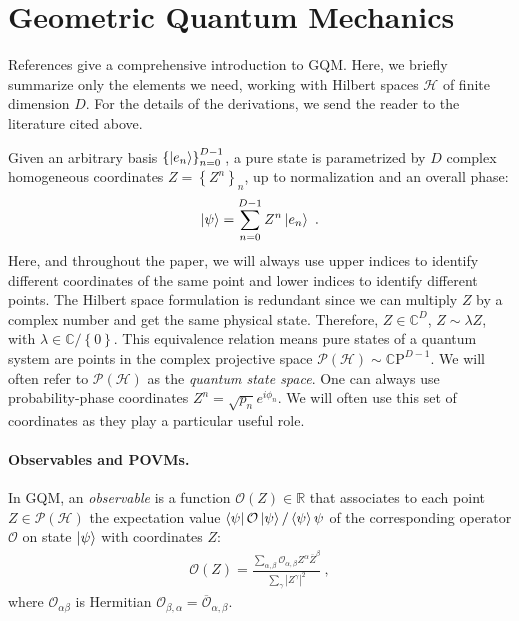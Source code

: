 \documentclass[draft,nofootinbib,pre,twocolumn,showpacs,showkeys,preprintnumbers,floatfix]{revtex4-1}
\newcommand{\1}{\mathbbm{1}}
\newcommand{\PH}{\mathcal{P}(\mathcal{H})}
\begin{document}
\section{Geometric Quantum Mechanics}
\label{sec:GQM}

References
\cite{STROCCHI1966,Miel68,Kibble1979,Heslot1985,Page87,And90,Gibbons1992,Ashtekar1995,Ashtekar1999,Brody2001,Bengtsson2017,Carinena2007,Chruscinski2006,Marmo2010,Avron2020,Pastorello2015,Pastorello2015a,Pastorello2016,Clemente-Gallardo2013}
give a comprehensive introduction to GQM. Here, we briefly summarize only the
elements we need, working with Hilbert spaces $\mathcal{H}$ of finite dimension $D$.
For the details of the derivations, we send the reader to the literature cited above.

Given an arbitrary basis $\left\{\ket{e_n} \right\}_{n=0}^{D-1}$, a pure state is
parametrized by $D$ complex homogeneous coordinates $Z = \left\{      Z^n\right\}_n$, up to
normalization and an overall phase:
\begin{align*}
\ket{\psi} = \sum_{n=0}^{D-1} Z^n \ket{e_n}~.
\end{align*}
Here, and throughout the paper, we will always use upper indices to identify different 
coordinates of the same point and lower indices to identify different points. The Hilbert space
formulation is redundant since we can multiply $Z$ by a complex number and get the same 
physical state. Therefore, $Z \in \mathbb{C}^{D}$, $Z \sim \lambda Z$, with $\lambda \in \mathbb{C}/\left\{ 0\right\}$. This equivalence 
relation means pure states of a quantum system are points in the complex projective space $\mathcal{P}\left(
\mathcal{H} \right) \sim \mathbb{C}\mathrm{P}^{D-1}$. We will often refer to $\PH$ as the \emph{quantum 
state space}. One can always use probability-phase coordinates $Z^n = \sqrt{p_n} e^{i\phi_n}$. We will often use 
this set of coordinates as they play a particular useful role.

\paragraph*{Observables and POVMs.} In GQM, an \emph{observable} is a function $\mathcal{O}(Z) \in
\mathbb{R}$ that associates to each point  $Z \in \mathcal{P}(\mathcal{H})$ the
expectation value $\bra{\psi} \mathcal{O} \ket{\psi}/\braket{\psi}{\psi}$ of the corresponding
operator $\mathcal{O}$ on state $\ket{\psi}$ with coordinates $Z$:
\begin{align}
\mathcal{O}(Z) = \frac{\sum_{\alpha,\beta} \mathcal{O}_{\alpha,\beta}Z^\alpha \overline{Z}^\beta}{\sum_{\gamma} \left\vert Z^\gamma\right\vert^2}
  ~,
\label{eq:GQM_Observable}
\end{align}
where $\mathcal{O}_{\alpha \beta}$ is Hermitian $\mathcal{O}_{\beta,\alpha} = \overline{\mathcal{O}}_{\alpha,\beta}$.
\end{document}
